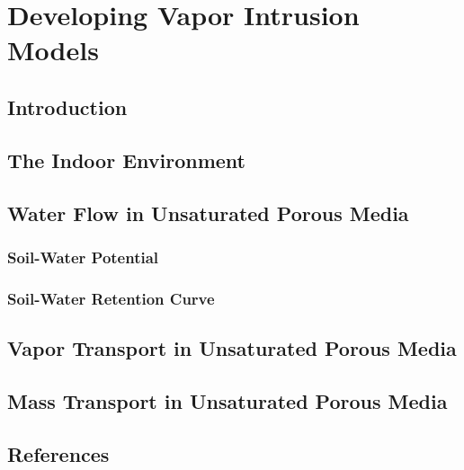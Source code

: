 \documentclass[../thesis.tex]{subfiles}
\begin{document}
\chapter{Developing Vapor Intrusion Models}

\section{Introduction}



\section{The Indoor Environment}


\section{Water Flow in Unsaturated Porous Media}

\subsection{Soil-Water Potential}

\subsection{Soil-Water Retention Curve}


\section{Vapor Transport in Unsaturated Porous Media}


\section{Mass Transport in Unsaturated Porous Media}




\section{References}
\end{document}
